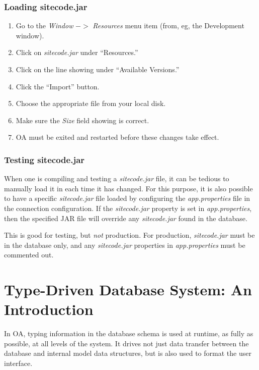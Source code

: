 \documentclass[11pt]{article}
\begin{document}
\subsubsection{Loading sitecode.jar}

\begin{enumerate}
\item Go to the \emph{Window} $->$ \emph{Resources} menu item (from, eg, the Development window).
 \item Click on \emph{sitecode.jar} under ``Resources.''

\item Click on the line showing under ``Available Versions.''

\item Click the ``Import'' button.

\item Choose the appropriate file from your local disk.

\item Make sure the \emph{Size} field showing is correct.

\item OA must be exited and restarted before these changes take effect.

\end{enumerate}

\subsubsection{Testing sitecode.jar}

When one is compiling and testing a \emph{sitecode.jar} file, it can be tedious to manually load it in each time it has changed.  For this purpose, it is also possible to have a specific \emph{sitecode.jar} file loaded by configuring the \emph{app.properties} file in the connection configuration.  If the \emph{sitecode.jar} property is set in \emph{app.properties}, then the specified JAR file will override any \emph{sitecode.jar} found in the database.

This is good for testing, but \emph{not} production.  For production, \emph{sitecode.jar} must be in the database only, and any \emph{sitecode.jar} properties in \emph{app.properties} must be commented out.

\section{Type-Driven Database System: An Introduction}

In OA, typing information in the database schema is used at runtime, as fully as
possible, at all levels of the system.  It drives not just data transfer
between the database and internal model data structures, but is also used to format the user interface.
\end{document}
